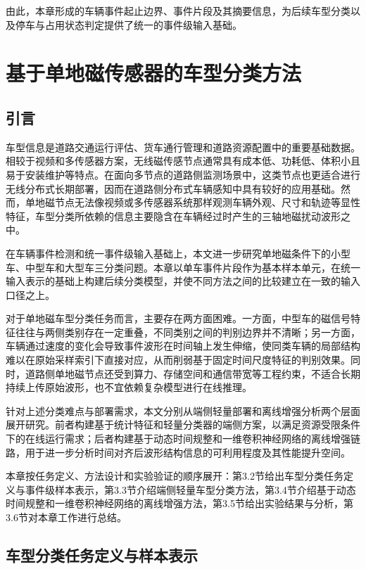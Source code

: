 \documentclass{xdupgthesis}
\begin{document}
由此，本章形成的车辆事件起止边界、事件片段及其摘要信息，为后续车型分类以及停车与占用状态判定提供了统一的事件级输入基础。




\chapter{基于单地磁传感器的车型分类方法}
\label{ch:veh_cls}

\section{引言}
\label{sec:ch3_intro}

车型信息是道路交通运行评估、货车通行管理和道路资源配置中的重要基础数据。相较于视频和多传感器方案，无线磁传感节点通常具有成本低、功耗低、体积小且易于安装维护等特点\cite{ch2_sifuentes2011wakeup}。在面向多节点的道路侧监测场景中，这类节点也更适合进行无线分布式长期部署\cite{R09}，因而在道路侧分布式车辆感知中具有较好的应用基础。然而，单地磁节点无法像视频或多传感器系统那样观测车辆外观、尺寸和轨迹等显性特征，车型分类所依赖的信息主要隐含在车辆经过时产生的三轴地磁扰动波形之中。

在车辆事件检测和统一事件级输入基础上，本文进一步研究单地磁条件下的小型车、中型车和大型车三分类问题。本章以单车事件片段作为基本样本单元，在统一输入表示的基础上构建后续分类模型，并使不同方法之间的比较建立在一致的输入口径之上。

对于单地磁车型分类任务而言，主要存在两方面困难。一方面，中型车的磁信号特征往往与两侧类别存在一定重叠，不同类别之间的判别边界并不清晰；另一方面，车辆通过速度的变化会导致事件波形在时间轴上发生伸缩，使同类车辆的局部结构难以在原始采样索引下直接对应，从而削弱基于固定时间尺度特征的判别效果。同时，道路侧单地磁节点还受到算力、存储空间和通信带宽等工程约束，不适合长期持续上传原始波形，也不宜依赖复杂模型进行在线推理。

针对上述分类难点与部署需求，本文分别从端侧轻量部署和离线增强分析两个层面展开研究。前者构建基于统计特征和轻量分类器的端侧方案，以满足资源受限条件下的在线运行需求；后者构建基于动态时间规整和一维卷积神经网络的离线增强链路，用于进一步分析时间对齐后波形结构信息的可利用程度及其性能提升空间。

本章按任务定义、方法设计和实验验证的顺序展开：第3.2节给出车型分类任务定义与事件级样本表示，第3.3节介绍端侧轻量车型分类方法，第3.4节介绍基于动态时间规整和一维卷积神经网络的离线增强方法，第3.5节给出实验结果与分析，第3.6节对本章工作进行总结。

\section{车型分类任务定义与样本表示}
\label{sec:ch3_task_data}
\end{document}

